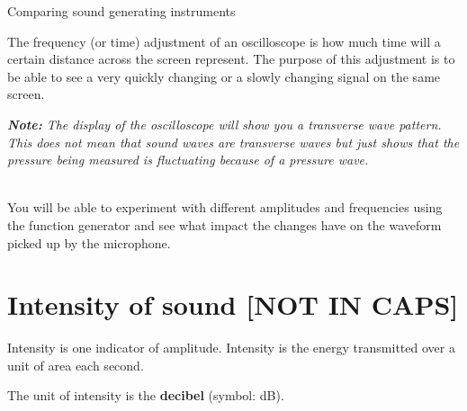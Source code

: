 \begin{activity}{Comparing sound generating instruments}
\begin{minipage}{.5\textwidth}
 	   The frequency (or time) adjustment of an oscilloscope is how much time will a certain distance across the screen represent. The purpose of this adjustment is to be able to see a very quickly changing or a slowly changing signal on the same screen. \\
\end{minipage}
\begin{minipage}{.5\textwidth}
\begin{center}
\begin{minipage}{.8\textwidth}
\vspace{.5cm}\textsl{\textbf{Note:} The display of the oscilloscope will show you a transverse wave pattern. This does not mean that sound waves are transverse waves but just shows that the pressure being measured is fluctuating because of a pressure wave.}
\end{minipage}
\end{center}
\end{minipage}
\vspace{1em}\\
You will be able to experiment with different amplitudes and frequencies using the function generator and see what impact the changes have on the waveform picked up by the microphone.\\
\end{activity}

            \section*{Intensity of sound [NOT IN CAPS]}
            \nopagebreak

	\par
      \label{m38800*id184075}Intensity is one indicator of amplitude. Intensity is the energy transmitted over a unit of area each second.\par 
\label{m38800*id184185}The unit of intensity is the \textbf{decibel} (symbol: dB).

